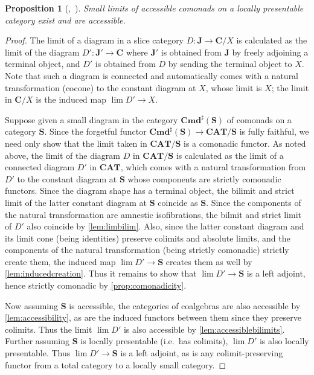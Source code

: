 \documentclass[11pt, oneside, article]{memoir}
\theoremstyle{plain}
\newtheorem{proposition}[theorem]{Proposition}
\theoremstyle{definition}
\theoremstyle{remark}
\newcommand{\namedcat}[1]{\mathbf{#1}}
\newcommand{\cat}[1]{\mathbf{#1}}
\newcommand{\CAT}{\namedcat{CAT}}
\newcommand{\Com}{\namedcat{Cmd}^\sharp}
\newcommand{\xX}{X}
\newcommand{\bC}{\cat{C}}
\newcommand{\bJ}{\cat{J}}
\newcommand{\bS}{\cat{S}}
\begin{document}
\begin{proposition}[{\cite[Section VIII]{kelly:transfinite},~\cite{blackwell}}]\label{prop:comonadlimit}
  Small limits of accessible comonads on a locally presentable
  category exist and are accessible.
\end{proposition}
\begin{proof}
  The limit of a diagram in a slice category
  $D \colon \bJ \to \bC/\xX$ is calculated as the limit of the diagram
  $D' \colon \bJ' \to \bC$ where $\bJ'$ is obtained from $\bJ$ by
  freely adjoining a terminal object, and $D'$ is obtained from $D$ by
  sending the terminal object to $\xX$. Note that such a diagram is
  connected and automatically comes with a natural transformation
  (cocone) to the constant diagram at $\xX$, whose limit is $\xX$; the
  limit in $\bC/\xX$ is the induced map $\lim D' \to \xX$.

  Suppose given a small diagram in the category $\Com(\bS)$ of
  comonads on a category $\bS$. Since the forgetful functor
  $\Com(\bS) \to \CAT/\bS$ is fully faithful, we need only show that
  the limit taken in $\CAT/\bS$ is a comonadic functor. As noted
  above, the limit of the diagram $D$ in $\CAT/\bS$ is calculated as
  the limit of a connected diagram $D'$ in $\CAT$, which comes with a
  natural transformation from $D'$ to the constant diagram at $\bS$
  whose components are strictly comonadic functors. Since the diagram
  shape has a terminal object, the bilimit and strict limit of the
  latter constant diagram at $\bS$ coincide as $\bS$. Since the
  components of the natural transformation are amnestic isofibrations,
  the bilmit and strict limit of $D'$ also coincide by
  \cref{lem:limbilim}. Also, since the latter constant diagram and its
  limit cone (being identities) preserve colimits and absolute limits,
  and the components of the natural transformation (being strictly
  comonadic) strictly create them, the induced map $\lim D' \to \bS$
  creates them as well by \cref{lem:inducedcreation}. Thus it remains
  to show that $\lim D' \to \bS$ is a left adjoint, hence strictly
  comonadic by \cref{prop:comonadicity}.

  Now assuming $\bS$ is accessible, the categories of coalgebras are
  also accessible by \cref{lem:accessibility}, as are the induced
  functors between them since they preserve colimits. Thus the limit
  $\lim D'$ is also accessible by \cref{lem:accessiblebilimits}.
  Further assuming $\bS$ is locally presentable (i.e.\ has colimits),
  $\lim D'$ is also locally presentable. Thus $\lim D' \to \bS$ is a
  left adjoint, as is any colimit-preserving functor from a total
  category to a locally small category.
\end{proof}
\end{document}
